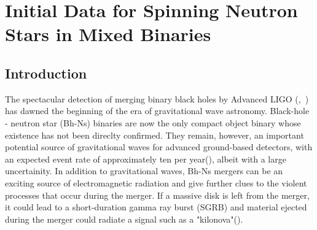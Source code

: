 

\chapter{Initial Data for Spinning Neutron Stars in Mixed Binaries}

\section{Introduction}
The spectacular detection of merging binary black holes by Advanced
LIGO (\cite{PhysRevLett.116.241103},~\cite{Abbott:2016blz}) has dawned the beginning of the era of gravitational wave astronomy. Black-hole - neutron star (Bh-Ns) binaries are now the only compact object binary whose existence has not been direclty confirmed. They remain, however, an important potential source of gravitational waves for advanced ground-based detectors, with an expected event rate of approximately ten per year(\cite{AbadieLSC:2010}), albeit with a large uncertainity. In addition to gravitational waves, Bh-Ns mergers can be an exciting source of electromagnetic radiation and give further clues to the violent processes that occur during the merger. If a massive disk is left from the merger, it could lead to a short-duration gamma ray burst (SGRB) and material ejected during the merger could radiate a signal such as a "kilonova"(\cite{metzger:11}).

